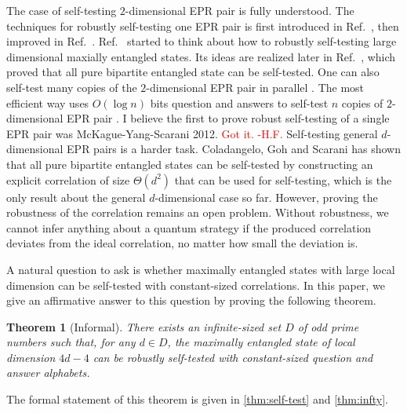 \documentclass[11pt,letterpaper]{article}
\newcommand{\1}{\mathbb{1}}
\def\carl#1{{\color{blue} #1}}
\newcommand{\hfc}[1]{\textcolor{red}{#1 -H.F.}}
\newtheorem{theorem}{Theorem}[section]
\theoremstyle{definition}
\begin{document}
The case of self-testing $2$-dimensional EPR pair is fully understood.
The techniques for robustly self-testing one EPR pair is 
first introduced in Ref.~\cite{mckague2012}, then improved in Ref.~\cite{bamps2015}. 
Ref.~\cite{yang2013} started to think about how to robustly self-testing large dimensional maxially entangled states.
Its ideas are realized later in Ref.~\cite{coladan2017all}, which proved that all pure bipartite entangled state 
can be self-tested.
One can also self-test many copies of the $2$-dimensional EPR
pair in parallel \cite{mckague2016,natarajan2017,coladan2016parallel}.
The most efficient way uses $O(\log n)$ bits question and
answers to self-test $n$ copies of $2$-dimensional EPR
pair \cite{lowdegree}.
\carl{I believe the first to prove robust self-testing of a single EPR pair was McKague-Yang-Scarani 2012.}
\hfc{Got it.}
Self-testing general $d$-dimensional EPR pairs is a harder task.
Coladangelo, Goh and Scarani has shown that all pure bipartite entangled states can be self-tested \cite{coladan2017all}
by constructing an explicit correlation of size $\Theta(d^2)$ that can be used for self-testing,
which is the only result about the general $d$-dimensional case so far.
However, proving the robustness of the correlation remains an open problem. 
Without robustness, we cannot infer anything about a quantum strategy if
the produced correlation deviates from the ideal correlation, no matter how small the 
deviation is. 
 
A natural question to ask is whether maximally entangled states with large local dimension
can be self-tested with constant-sized correlations. 
In this paper, we give an affirmative answer to this question by proving the following theorem.
\begin{theorem}[Informal]
\label{thm:inf}
	There exists an infinite-sized set $D$ of odd prime numbers such that, for any $d \in D$, 
	the maximally entangled state of local dimension $4d-4$ can be robustly self-tested 
	with constant-sized question and answer alphabets.
\end{theorem}
The formal statement of this theorem is given in \cref{thm:self-test} and \cref{thm:infty}.
\end{document}
